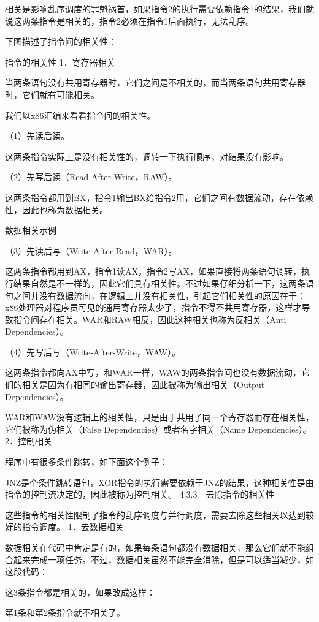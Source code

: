 \documentclass[12pt,UTF8]{ctexbook}
\begin{document}
相关是影响乱序调度的罪魁祸首，如果指令2的执行需要依赖指令1的结果，我们就说这两条指令是相关的，指令2必须在指令1后面执行，无法乱序。

下图描述了指令间的相关性：

指令的相关性
1．寄存器相关

当两条语句没有共用寄存器时，它们之间是不相关的，而当两条语句共用寄存器时，它们就有可能相关。

我们以x86汇编来看看指令间的相关性。

（1）先读后读。

这两条指令实际上是没有相关性的，调转一下执行顺序，对结果没有影响。

（2）先写后读（Read-After-Write，RAW）。

这两条指令都用到BX，指令1输出BX给指令2用，它们之间有数据流动，存在依赖性，因此也称为数据相关。

数据相关示例

（3）先读后写（Write-After-Read，WAR）。

这两条指令都用到AX，指令1读AX，指令2写AX，如果直接将两条语句调转，执行结果自然是不一样的，因此它们具有相关性。不过如果仔细分析一下，这两条语句之间并没有数据流向，在逻辑上并没有相关性，引起它们相关性的原因在于：x86处理器对程序员可见的通用寄存器太少了，指令不得不共用寄存器，这样才导致指令间存在相关。WAR和RAW相反，因此这种相关也称为反相关（Anti Dependencies）。

（4）先写后写（Write-After-Write，WAW）。

这两条指令都向AX中写，和WAR一样，WAW的两条指令间也没有数据流动，它们的相关是因为有相同的输出寄存器，因此被称为输出相关（Output Dependencies）。

WAR和WAW没有逻辑上的相关性，只是由于共用了同一个寄存器而存在相关性，它们被称为伪相关（False Dependencies）或者名字相关（Name Dependencies）。
2．控制相关

程序中有很多条件跳转，如下面这个例子：

JNZ是个条件跳转语句，XOR指令的执行需要依赖于JNZ的结果，这种相关性是由指令的控制流决定的，因此被称为控制相关。
4.3.3　去除指令的相关性

这些指令的相关性限制了指令的乱序调度与并行调度，需要去除这些相关以达到较好的指令调度。
1．去数据相关

数据相关在代码中肯定是有的，如果每条语句都没有数据相关，那么它们就不能组合起来完成一项任务。不过，数据相关虽然不能完全消除，但是可以适当减少，如这段代码：

这3条指令都是相关的，如果改成这样：

第1条和第2条指令就不相关了。
\end{document}
